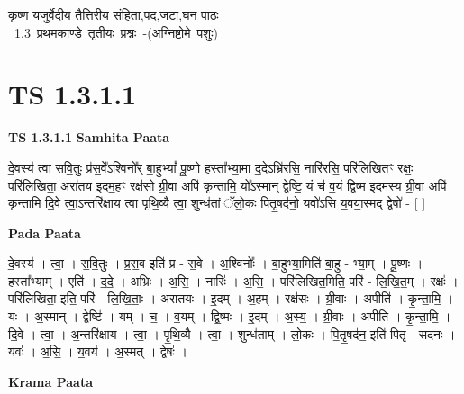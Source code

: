\documentclass[17pt]{extarticle}
\begin{document}
\begin{titlepage}
    \begin{center}
 
\begin{sanskrit}
    { \Large
    कृष्ण यजुर्वेदीय तैत्तिरीय संहिता,पद,जटा,घन पाठः 
    }
    \\
    \vspace{2.5cm}
    \mbox{ \Large
    1.3     प्रथमकाण्डे तृतीयः प्रश्नः -(अग्निष्टोमे पशुः)   }
\end{sanskrit}
\end{center}

\end{titlepage}
\tableofcontents
{}
\pagebreak


\section{ TS 1.3.1.1 }

\textbf{TS 1.3.1.1 } \newline
\textbf{Samhita Paata} \newline

दे॒वस्य॑ त्वा सवि॒तुः प्र॑स॒वे᳚ऽश्विनो᳚र् बा॒हुभ्यां᳚ पू॒ष्णो हस्ता᳚भ्या॒मा द॒देऽभ्रि॑रसि॒ नारि॑रसि॒ परि॑लिखितꣳ॒॒ रक्षः॒ परि॑लिखिता॒ अरा॑तय इ॒दम॒हꣳ रक्ष॑सो ग्री॒वा अपि॑ कृन्तामि॒ यो᳚ऽस्मान् द्वेष्टि॒ यं च॑ व॒यं द्वि॒ष्म इ॒दम॑स्य ग्री॒वा अपि॑ कृन्तामि दि॒वे त्वा॒ऽन्तरि॑क्षाय त्वा पृथि॒व्यै त्वा॒ शुन्ध॑तां ॅलो॒कः पि॑तृ॒षद॑नो॒ यवो॑ऽसि य॒वया॒स्मद् द्वेषो॑ - [ ] \newline

\textbf{Pada Paata} \newline

दे॒वस्य॑ । त्वा॒ । स॒वि॒तुः । प्र॒स॒व इति॑ प्र - स॒वे । अ॒श्विनोः᳚ । बा॒हुभ्या॒मिति॑ बा॒हु - भ्या॒म् । पू॒ष्णः । हस्ता᳚भ्याम् । एति॑ । द॒दे॒ । अभ्रिः॑ । अ॒सि॒ । नारिः॑ । अ॒सि॒ । परि॑लिखित॒मिति॒ परि॑ - लि॒खि॒त॒म् । रक्षः॑ । परि॑लिखिता॒ इति॒ परि॑ - लि॒खि॒ताः॒ । अरा॑तयः । इ॒दम् । अ॒हम् । रक्ष॑सः । ग्री॒वाः । अपीति॑ । कृ॒न्ता॒मि॒ । यः । अ॒स्मान् । द्वेष्टि॑ । यम् । च॒ । व॒यम् । द्वि॒ष्मः । इ॒दम् । अ॒स्य॒ । ग्री॒वाः । अपीति॑ । कृ॒न्ता॒मि॒ । दि॒वे । त्वा॒ । अ॒न्तरि॑क्षाय । त्वा॒ । पृ॒थि॒व्यै । त्वा॒ । शुन्ध॑ताम् । लो॒कः । पि॒तृ॒षद॑न॒ इति॑ पितृ - सद॑नः । यवः॑ । अ॒सि॒ । य॒वय॑ । अ॒स्मत् । द्वेषः॑ ।  \newline


\textbf{Krama Paata} \newline
\end{document}
